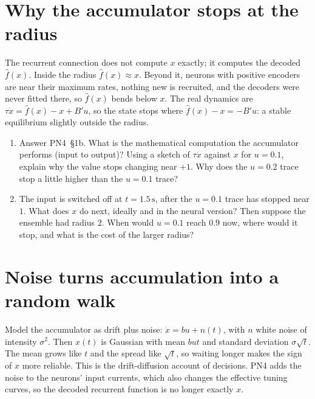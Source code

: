 \documentclass[11pt,letterpaper]{article}
\begin{document}
\section{Why the accumulator stops at the radius}

\begin{idea}
The recurrent connection does not compute $x$ exactly; it computes the decoded $\hat f(x)$. Inside the radius $\hat f(x) \approx x$. Beyond it, neurons with positive encoders are near their maximum rates, nothing new is recruited, and the decoders were never fitted there, so $\hat f(x)$ bends below $x$. The real dynamics are $\tau\dot x = \hat f(x) - x + B'u$, so the state stops where $\hat f(x) - x = -B'u$: a stable equilibrium slightly outside the radius.
\end{idea}

\begin{enumerate}
\item Answer PN4~\S1b. What is the mathematical computation the accumulator performs (input to output)? Using a sketch of $\tau\dot x$ against $x$ for $u = 0.1$, explain why the value stops changing near $+1$. Why does the $u = 0.2$ trace stop a little higher than the $u = 0.1$ trace?
\item The input is switched off at $t = 1.5\,\mathrm{s}$, after the $u = 0.1$ trace has stopped near $1$. What does $x$ do next, ideally and in the neural version? Then suppose the ensemble had radius $2$. When would $u = 0.1$ reach $0.9$ now, where would it stop, and what is the cost of the larger radius?
\end{enumerate}

\section{Noise turns accumulation into a random walk}

\begin{idea}
Model the accumulator as drift plus noise: $\dot x = b u + n(t)$, with $n$ white noise of intensity $\sigma^2$. Then $x(t)$ is Gaussian with mean $but$ and standard deviation $\sigma\sqrt t$. The mean grows like $t$ and the spread like $\sqrt t$, so waiting longer makes the sign of $x$ more reliable. This is the drift-diffusion account of decisions. PN4 adds the noise to the neurons' input currents, which also changes the effective tuning curves, so the decoded recurrent function is no longer exactly $x$.
\end{idea}
\end{document}
